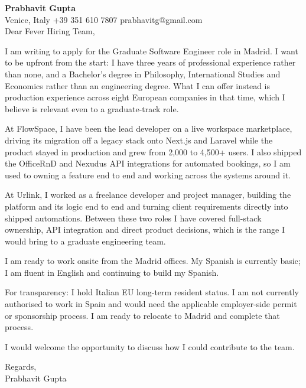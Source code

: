 \documentclass[a4paper,10.5pt]{article}
\begin{document}
\textbf{Prabhavit Gupta}\\
Venice, Italy \textbar{} +39 351 610 7807 \textbar{} prabhavitg@gmail.com\\[10pt]
Dear Fever Hiring Team,

I am writing to apply for the Graduate Software Engineer role in Madrid. I want to be upfront from the start: I have three years of professional experience rather than none, and a Bachelor's degree in Philosophy, International Studies and Economics rather than an engineering degree. What I can offer instead is production experience across eight European companies in that time, which I believe is relevant even to a graduate-track role.

At FlowSpace, I have been the lead developer on a live workspace marketplace, driving its migration off a legacy stack onto Next.js and Laravel while the product stayed in production and grew from 2,000 to 4,500+ users. I also shipped the OfficeRnD and Nexudus API integrations for automated bookings, so I am used to owning a feature end to end and working across the systems around it.

At Urlink, I worked as a freelance developer and project manager, building the platform and its logic end to end and turning client requirements directly into shipped automations. Between these two roles I have covered full-stack ownership, API integration and direct product decisions, which is the range I would bring to a graduate engineering team.

I am ready to work onsite from the Madrid offices. My Spanish is currently basic; I am fluent in English and continuing to build my Spanish.

For transparency: I hold Italian EU long-term resident status. I am not currently authorised to work in Spain and would need the applicable employer-side permit or sponsorship process. I am ready to relocate to Madrid and complete that process.

I would welcome the opportunity to discuss how I could contribute to the team.

Regards,\\
Prabhavit Gupta
\end{document}
